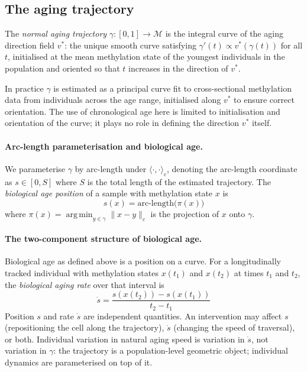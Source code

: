 \subsection{The aging trajectory}
\label{sec:trajectory}

\begin{definition}
The \emph{normal aging trajectory} $\gamma : [0,1] \to \mathcal{M}$ is the integral
curve of the aging direction field $v^*$: the unique smooth curve satisfying
$\gamma'(t) \propto v^*(\gamma(t))$ for all $t$, initialised at the mean methylation
state of the youngest individuals in the population and oriented so that $t$
increases in the direction of $v^*$.
\end{definition}

In practice $\gamma$ is estimated as a principal curve \cite{hastie1989} fit to
cross-sectional methylation data from individuals across the age range, initialised
along $v^*$ to ensure correct orientation. The use of chronological age here is
limited to initialisation and orientation of the curve; it plays no role in defining
the direction $v^*$ itself.

\paragraph{Arc-length parameterisation and biological age.}
We parameterise $\gamma$ by arc-length under $\langle \cdot, \cdot \rangle_c$,
denoting the arc-length coordinate as $s \in [0, S]$ where $S$ is the total
length of the estimated trajectory. The \emph{biological age position} of a sample
with methylation state $x$ is
\begin{equation}
  s(x) = \text{arc-length}\bigl(\pi(x)\bigr)
  \label{eq:bioage}
\end{equation}
where $\pi(x) = \operatorname{arg\,min}_{y \in \gamma} \|x - y\|_c$ is the
projection of $x$ onto $\gamma$.

\paragraph{The two-component structure of biological age.}
Biological age as defined above is a position on a curve. For a longitudinally
tracked individual with methylation states $x(t_1)$ and $x(t_2)$ at times $t_1$
and $t_2$, the \emph{biological aging rate} over that interval is
\begin{equation}
  \dot{s} = \frac{s(x(t_2)) - s(x(t_1))}{t_2 - t_1}
  \label{eq:agingrate}
\end{equation}
Position $s$ and rate $\dot{s}$ are independent quantities. An intervention may
affect $s$ (repositioning the cell along the trajectory), $\dot{s}$ (changing the
speed of traversal), or both. Individual variation in natural aging speed is
variation in $\dot{s}$, not variation in $\gamma$: the trajectory is a
population-level geometric object; individual dynamics are parameterised on top
of it.

